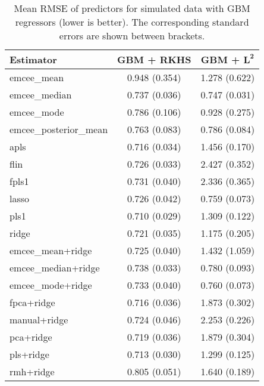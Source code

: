 \newpage

\begin{table}[p]
  \centering
  \begin{tabular}{lcc}
\toprule
            \textbf{Estimator} &            \textbf{GBM + RKHS} &           \textbf{GBM + \(\symbf{L^2}\)} \\
\midrule
          emcee\_mean & 0.948 (0.354) & 1.278 (0.622) \\
        emcee\_median & 0.737 (0.036) & 0.747 (0.031) \\
          emcee\_mode & 0.786 (0.106) & 0.928 (0.275) \\
emcee\_posterior\_mean & 0.763 (0.083) & 0.786 (0.084) \\
                apls & 0.716 (0.034) & 1.456 (0.170) \\
                flin & 0.726 (0.033) & 2.427 (0.352) \\
               fpls1 & 0.731 (0.040) & 2.336 (0.365) \\
               lasso & 0.726 (0.042) & 0.759 (0.073) \\
                pls1 & 0.710 (0.029) & 1.309 (0.122) \\
               ridge & 0.721 (0.035) & 1.175 (0.205) \\

\bottomrule
\toprule
  emcee\_mean+ridge & 0.725 (0.040) & 1.432 (1.059) \\
emcee\_median+ridge & 0.738 (0.033) & 0.780 (0.093) \\
  emcee\_mode+ridge & 0.733 (0.040) & 0.760 (0.073) \\
        fpca+ridge & 0.716 (0.036) & 1.873 (0.302) \\
      manual+ridge & 0.724 (0.046) & 2.253 (0.226) \\
         pca+ridge & 0.719 (0.036) & 1.879 (0.304) \\
         pls+ridge & 0.713 (0.030) & 1.299 (0.125) \\
         rmh+ridge & 0.805 (0.051) & 1.640 (0.189) \\

\bottomrule
\end{tabular}
  \caption{Mean RMSE of predictors for simulated data with GBM regressors (lower is better). The corresponding standard errors are shown between brackets.}
\end{table}

\newpage

